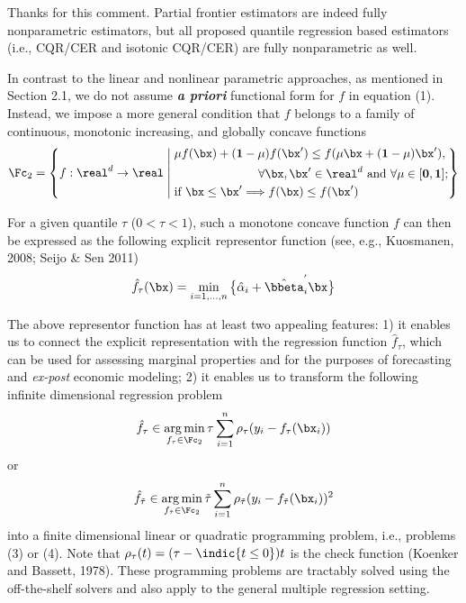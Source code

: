 \documentclass[12pt]{article}
\newcommand{\np}{\vskip 0.3cm}
\begin{document}
\begin{response}
Thanks for this comment. Partial frontier estimators are indeed fully nonparametric estimators, but all proposed quantile regression based estimators (i.e., CQR/CER and isotonic CQR/CER) are fully nonparametric as well.\np

In contrast to the linear and nonlinear parametric approaches, as mentioned in Section 2.1, we do not assume \textbf{\textit{a priori}} functional form for $f$ in equation (1). Instead, we impose a more general condition that $f$ belongs to a family of continuous, monotonic increasing, and globally concave functions
\begin{equation*}
    \Fc_2 = \left\{
          f: \real^d \rightarrow \real \;\middle|\;
          \begin{aligned}
          & \mu f(\bx) + (\textbf{1}-\mu) f(\bx^\prime) \le f(\mu \bx + (\textbf{1}-\mu) \bx^\prime), \\
          & \hspace*{7em} \forall \bx, \bx^\prime \in \real^d \text{ } \text{and} \text{ } \forall \mu \in [\textbf{0}, \textbf{1}] ; \\
          & \text{if} \text{ } \bx \le \bx^\prime \Longrightarrow f(\bx) \le f(\bx^\prime)
          \end{aligned}
    \right\}
\end{equation*}
\np

For a given quantile $\tau$ ($0<\tau<1$), such a monotone concave function $f$ can then be expressed as the following explicit representor function (see, e.g., Kuosmanen, 2008; Seijo \& Sen 2011)
\begin{equation*}
    \hat{f}_{\tau}(\bx)=\min_{i = 1, \ldots, n} \big\{\hat{\alpha}_i+\hat{\bbeta}_i^{'}\bx \big\}
\end{equation*}
\np

The above representor function has at least two appealing features: 1) it enables us to connect the explicit representation with the regression function $\hat{f}_{\tau}$, which can be used for assessing marginal properties and for the purposes of forecasting and \textit{ex-post} economic modeling; 2) it enables us to transform the following infinite dimensional regression problem 
\begin{equation*}
\hat{f}_\tau \in \operatorname*{arg\,min}_{f_\tau \in \Fc_2}\tau\sum^{n}_{i=1}\rho_\tau(y_i - f_\tau(\bx_i))
\end{equation*}
or \begin{equation*}
\hat{f}_{\tilde{\tau}} \in \operatorname*{arg\,min}_{f_{\tilde{\tau}} \in \Fc_2}{\tilde{\tau}}\sum^{n}_{i=1}\rho_{\tilde{\tau}}(y_i - f_{\tilde{\tau}}(\bx_i))^2
\end{equation*}
into a finite dimensional linear or quadratic programming problem, i.e., problems (3) or (4). Note that $\rho_\tau(t) = (\tau - \indic \{t \le 0\})t$ is the check function (Koenker and Bassett, 1978). These programming problems are tractably solved using the off-the-shelf solvers and also apply to the general multiple regression setting.\np


\end{response}
\end{document}
